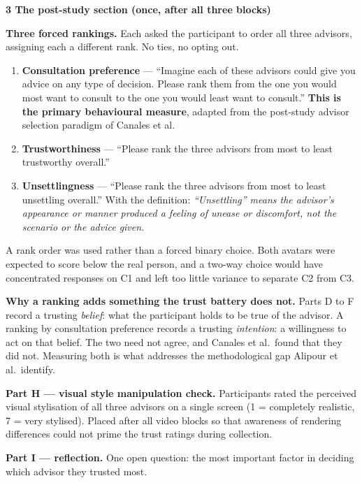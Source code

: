 \documentclass[10pt,a4paper]{article}
\newcommand{\sect}[1]{%
  \needspace{4\baselineskip}\vspace{0.7em}
  \noindent\colorbox{knblue}{\parbox{0.978\textwidth}{\vspace{1pt}\color{white}\textbf{#1}\vspace{1pt}}}
  \vspace{0.3em}\par}
\newcommand{\key}[1]{{\color{knblue}\textbf{#1}}}
\begin{document}
\sect{3 \quad The post-study section (once, after all three blocks)}

\textbf{Three forced rankings.} Each asked the participant to order all three advisors, assigning each a different rank. No ties, no opting out.

\begin{enumerate}[leftmargin=1.4em,itemsep=0.15em]
  \item \key{Consultation preference} — ``Imagine each of these advisors could give you advice on any type of decision. Please rank them from the one you would most want to consult to the one you would least want to consult.'' \textbf{This is the primary behavioural measure}, adapted from the post-study advisor selection paradigm of Canales et al.
  \item \key{Trustworthiness} — ``Please rank the three advisors from most to least trustworthy overall.''
  \item \key{Unsettlingness} — ``Please rank the three advisors from most to least unsettling overall.'' With the definition: \emph{``Unsettling'' means the advisor's appearance or manner produced a feeling of unease or discomfort, not the scenario or the advice given.}
\end{enumerate}

A rank order was used rather than a forced binary choice. Both avatars were expected to score below the real person, and a two-way choice would have concentrated responses on C1 and left too little variance to separate C2 from C3.

\textbf{Why a ranking adds something the trust battery does not.} Parts D to F record a trusting \emph{belief}: what the participant holds to be true of the advisor. A ranking by consultation preference records a trusting \emph{intention}: a willingness to act on that belief. The two need not agree, and Canales et al.\ found that they did not. Measuring both is what addresses the methodological gap Alipour et al.\ identify.

\vspace{0.35em}
\textbf{Part H — visual style manipulation check.} Participants rated the perceived visual stylisation of all three advisors on a single screen (1 = completely realistic, 7 = very stylised). Placed after all video blocks so that awareness of rendering differences could not prime the trust ratings during collection.

\textbf{Part I — reflection.} One open question: the most important factor in deciding which advisor they trusted most.
\end{document}
